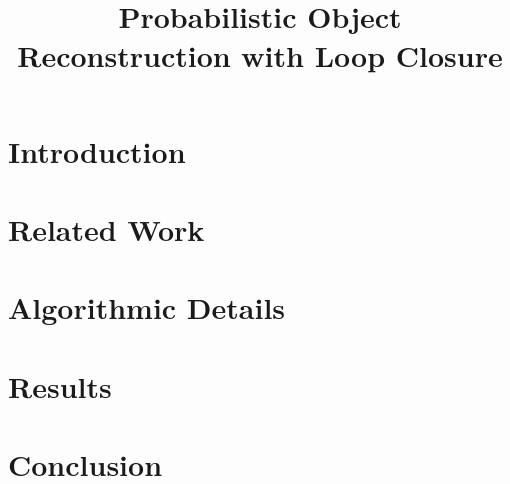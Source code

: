 \documentclass{bmvc2k}
\title{Probabilistic Object Reconstruction with Loop Closure}
\begin{document}
\maketitle

\begin{abstract}

\end{abstract}

\section{Introduction}
\label{sec:introduction}


\section{Related Work}
\label{sec:lit_review}


\section{Algorithmic Details}



\section{Results}
\label{sec:results}


\vspace{-\baselineskip}

\section{Conclusion}
\label{sec:discussion}



\end{document}
